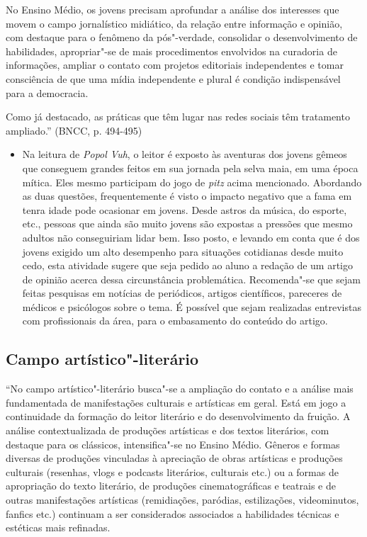 \documentclass[12pt]{extarticle}
\begin{document}
No Ensino Médio, os jovens precisam aprofundar a análise dos interesses
que movem o campo jornalístico midiático, da relação entre informação e
opinião, com destaque para o fenômeno da pós"-verdade, consolidar o
desenvolvimento de habilidades, apropriar"-se de mais procedimentos
envolvidos na curadoria de informações, ampliar o contato com projetos
editoriais independentes e tomar consciência de que uma mídia
independente e plural é condição indispensável para a democracia.

Como já destacado, as práticas que têm lugar nas redes sociais têm
tratamento ampliado.'' (BNCC, p. 494-495)

\begin{itemize}
\item
  Na leitura de \emph{Popol Vuh}, o leitor é exposto às aventuras dos
  jovens gêmeos que conseguem grandes feitos em sua jornada pela selva
  maia, em uma época mítica. Eles mesmo participam do jogo de
  \emph{pitz} acima mencionado. Abordando as duas questões,
  frequentemente é visto o impacto negativo que a fama em tenra idade
  pode ocasionar em jovens. Desde astros da música, do esporte, etc.,
  pessoas que ainda são muito jovens são expostas a pressões que mesmo
  adultos não conseguiriam lidar bem. Isso posto, e levando em conta que
  é dos jovens exigido um alto desempenho para situações cotidianas
  desde muito cedo, esta atividade sugere que seja pedido ao aluno a
  redação de um artigo de opinião acerca dessa circunstância
  problemática. Recomenda"-se que sejam feitas pesquisas em notícias de
  periódicos, artigos científicos, pareceres de médicos e psicólogos
  sobre o tema. É possível que sejam realizadas entrevistas com
  profissionais da área, para o embasamento do conteúdo do artigo.
\end{itemize}

\subsection{Campo artístico"-literário }

``No campo artístico"-literário busca"-se a ampliação do contato e a
análise mais fundamentada de manifestações culturais e artísticas em
geral. Está em jogo a continuidade da formação do leitor literário e do
desenvolvimento da fruição. A análise contextualizada de produções
artísticas e dos textos literários, com destaque para os clássicos,
intensifica"-se no Ensino Médio. Gêneros e formas diversas de produções
vinculadas à apreciação de obras artísticas e produções culturais
(resenhas, vlogs e podcasts literários, culturais etc.) ou a formas de
apropriação do texto literário, de produções cinematográficas e teatrais
e de outras manifestações artísticas (remidiações, paródias,
estilizações, videominutos, fanfics etc.) continuam a ser considerados
associados a habilidades técnicas e estéticas mais refinadas.
\end{document}
